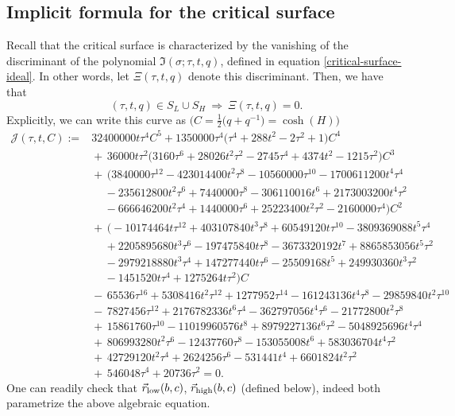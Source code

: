 \documentclass[10pt,a4paper]{amsart}
\numberwithin{equation}{section}
\begin{document}
\subsection{Implicit formula for the critical surface}
Recall that the critical surface is characterized by the vanishing of the discriminant of the polynomial $\mathfrak{I}(\sigma;\tau,t,q)$, defined in
equation \eqref{critical-surface-ideal}. In other words, let $\Xi(\tau,t,q)$ denote this discriminant. Then, we have that
 \begin{equation*}
 (\tau,t,q) \in S_{L} \cup S_{H} \ \Longrightarrow \ \Xi(\tau,t,q) = 0.
 \end{equation*}
Explicitly, we can write this curve as $\bigl(C = \frac{1}{2}\bigl(q+q^{-1}\bigr) = \cosh(H)\bigr)$
 \begin{align*}
 \mathcal{J}(\tau,t,C) :={}& 32400000 t \tau^{4}C^5 + 1350000 \tau^{4} \bigl(\tau^{4}+288 t^{2}-2 \tau^{2}+1\bigr)C^4\\
 &{}{+}\, 36000 t \tau^{2} \bigl(3160 \tau^{6}+28026 t^{2} \tau^{2}-2745 \tau^{4}+4374 t^{2}-1215 \tau^{2}\bigr)C^3\\
 &{}{+}\, \bigl(3840000 \tau^{12}-423014400 t^{2} \tau^{8}-10560000 \tau^{10}-1700611200 t^{4} \tau^{4}\\
 &{}\, \quad-235612800 t^{2} \tau^{6}+ 7440000 \tau^{8}-306110016 t^{6}+2173003200 t^{4} \tau^{2}\\
 &{}\, \quad-666646200 t^{2} \tau^{4}+1440000 \tau^{6}+ 25223400 t^{2} \tau^{2}-2160000 \tau^{4}\bigr)C^2\\
 &{}{+}\,\bigl(-10174464 t \tau^{12}+403107840 t^{3} \tau^{8}+60549120 t \tau^{10}-3809369088 t^{5} \tau^{4}\\
 &{}\, \quad+2205895680 t^{3} \tau^{6}
 -197475840 t \tau^{8}-3673320192 t^{7}+8865853056 t^{5} \tau^{2}\\
 &{}\, \quad-2979218880 t^{3} \tau^{4}+147277440 t \tau^{6}-25509168 t^{5}
 +249930360 t^{3} \tau^{2}\\
 &{}\, \quad-1451520 t \tau^{4}+1275264 t \tau^{2}\bigr)C\\
 &{}{-}\,65536 \tau^{16}+5308416 t^{2} \tau^{12}+1277952 \tau^{14}-161243136 t^{4} \tau^{8}-29859840 t^{2} \tau^{10}\\
 &{}{-}\,7827456 \tau^{12}
 +2176782336 t^{6} \tau^{4}-362797056 t^{4} \tau^{6}-21772800 t^{2} \tau^{8}\\
 &{}{+}\, 15861760 \tau^{10}-11019960576 t^{8}+8979227136 t^{6} \tau^{2}
 -5048925696 t^{4} \tau^{4}\\
 &{}{+}\,806993280 t^{2} \tau^{6}-12437760 \tau^{8}-153055008 t^{6}+583036704 t^{4} \tau^{2}\\
 &{}{+}\,42729120 t^{2} \tau^{4}+2624256 \tau^{6}-531441 t^{4}+6601824 t^{2} \tau^{2}\\
 &{}{+}\,546048 \tau^{4}+20736 \tau^{2} = 0.
 \end{align*}
One can readily check that $\vec{r}_{{\rm low}}(b,c)$, $\vec{r}_{{\rm high}}(b,c)$ (defined below), indeed both parametrize the above algebraic equation.
\end{document}
